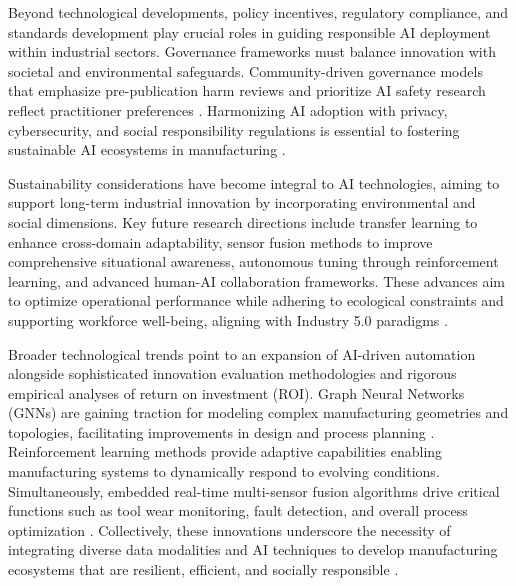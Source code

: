 \documentclass[sigconf]{acmart}
\begin{document}
Beyond technological developments, policy incentives, regulatory compliance, and standards development play crucial roles in guiding responsible AI deployment within industrial sectors. Governance frameworks must balance innovation with societal and environmental safeguards. Community-driven governance models that emphasize pre-publication harm reviews and prioritize AI safety research reflect practitioner preferences \cite{ref25}. Harmonizing AI adoption with privacy, cybersecurity, and social responsibility regulations is essential to fostering sustainable AI ecosystems in manufacturing \cite{ref44}.

Sustainability considerations have become integral to AI technologies, aiming to support long-term industrial innovation by incorporating environmental and social dimensions. Key future research directions include transfer learning to enhance cross-domain adaptability, sensor fusion methods to improve comprehensive situational awareness, autonomous tuning through reinforcement learning, and advanced human-AI collaboration frameworks. These advances aim to optimize operational performance while adhering to ecological constraints and supporting workforce well-being, aligning with Industry 5.0 paradigms \cite{ref5,ref6,ref7,ref44}.

Broader technological trends point to an expansion of AI-driven automation alongside sophisticated innovation evaluation methodologies and rigorous empirical analyses of return on investment (ROI). Graph Neural Networks (GNNs) are gaining traction for modeling complex manufacturing geometries and topologies, facilitating improvements in design and process planning \cite{ref31}. Reinforcement learning methods provide adaptive capabilities enabling manufacturing systems to dynamically respond to evolving conditions. Simultaneously, embedded real-time multi-sensor fusion algorithms drive critical functions such as tool wear monitoring, fault detection, and overall process optimization \cite{ref34,ref39}. Collectively, these innovations underscore the necessity of integrating diverse data modalities and AI techniques to develop manufacturing ecosystems that are resilient, efficient, and socially responsible \cite{ref9,ref33}.
\end{document}
